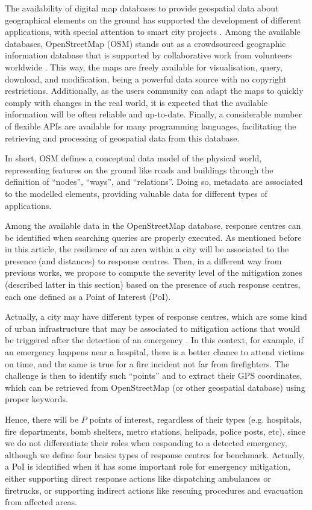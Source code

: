 \begin{refsection}
The availability of digital map databases to provide geospatial data about geographical elements on the ground has supported the development of different applications, with special attention to smart city projects \cite{spatial2,spatial1}. Among the available databases, OpenStreetMap (OSM) stands out as a crowdsourced geographic information database that is supported by collaborative work from volunteers worldwide \cite{openstreetmap}. This way, the maps are freely available for visualisation, query, download, and modification, being a powerful data source with no copyright restrictions. Additionally, as the users community can adapt the maps to quickly comply with changes in the real world, it is expected that the available information will be often reliable and up-to-date. Finally, a considerable number of flexible APIs are available for many programming languages, facilitating the retrieving and processing of geospatial data from this database.

In short, OSM defines a conceptual data model of the physical world, representing features on the ground like roads and buildings through the definition of ``nodes'', ``ways'', and ``relations''. Doing so, metadata are associated to the modelled elements, providing valuable data for different types of applications.

Among the available data in the OpenStreetMap database, response centres can be identified when searching queries are properly executed. As mentioned before in this article, the resilience of an area within a city will be associated to the presence (and distances) to response centres. Then, in a different way from previous works, we propose to compute the severity level of the mitigation zones (described latter in this section) based on the presence of such response centres, each one defined as a Point of Interest (PoI).

Actually, a city may have different types of response centres, which are some kind of urban infrastructure that may be associated to mitigation actions that would be triggered after the detection of an emergency \cite{surveyEmergencies}. In this context, for example, if an emergency happens near a hospital, there is a better chance to attend victims on time, and the same is true for a fire incident not far from firefighters. The challenge is then to identify such ``points'' and to extract their GPS coordinates, which can be retrieved from OpenStreetMap (or other geospatial database) using proper keywords. 

Hence, there will be $P$ points of interest, regardless of their types (e.g. hospitals, fire departments, bomb shelters, metro stations, helipads, police posts, etc), since we do not differentiate their roles when responding to a detected emergency, although we define four basics types of response centres for benchmark. Actually, a PoI is identified when it has some important role for emergency mitigation, either supporting direct response actions like dispatching ambulances or firetrucks, or supporting indirect actions like rescuing procedures and evacuation from affected areas.


\end{refsection}
